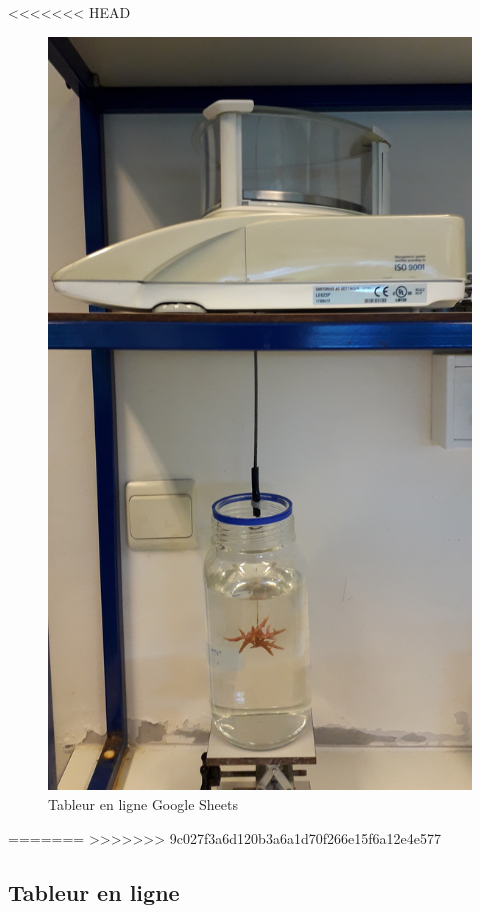 \documentclass[]{report}
\begin{document}
<<<<<<< HEAD
\begin{figure}[h!]
\includegraphics[]{../image/poster-balance.jpg}
\caption{Tableur en ligne Google Sheets}
\end{figure}

=======
>>>>>>> 9c027f3a6d120b3a6a1d70f266e15f6a12e4e577
\null
\newpage

\subsection{Tableur en ligne}\label{tableur-en-ligne}
\end{document}
